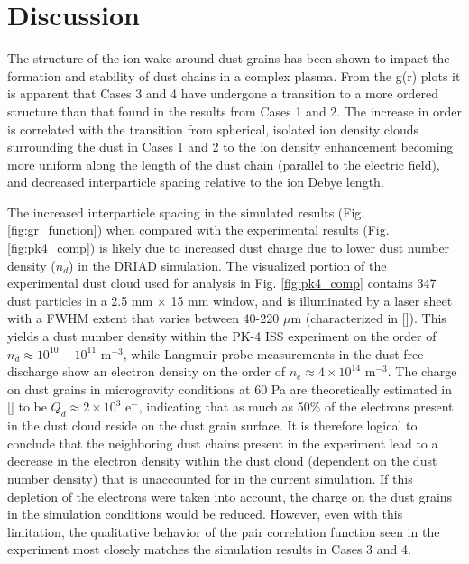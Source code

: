 \documentclass[aip,amsmath,amssymb,graphicx,floatfix,reprint]{revtex4-1}
\begin{document}
\section{Discussion}
\label{discussion}
The structure of the ion wake around dust grains has been shown to impact the formation and stability of dust chains in a complex plasma\cite{Ivlev2008,Matthews2020}.  From the g(r) plots it is apparent that Cases 3 and 4 have undergone a transition to a more ordered structure than that found in the results from Cases 1 and 2.  The increase in order is correlated with the transition from spherical, isolated ion density clouds surrounding the dust in Cases 1 and 2 to the ion density enhancement becoming more uniform along the length of the dust chain (parallel to the electric field), and decreased interparticle spacing relative to the ion Debye length.

The increased interparticle spacing in the simulated results (Fig. \ref{fig:gr_function}) when compared with the experimental results (Fig. \ref{fig:pk4_comp}) is likely due to increased dust charge due to lower dust number density ($n_d$) in the DRIAD simulation.  The visualized portion of the experimental dust cloud used for analysis in Fig. \ref{fig:pk4_comp} contains 347 dust particles in a 2.5 mm $\times$ 15 mm window, and is illuminated by a laser sheet with a FWHM extent that varies between 40-220 $\mu$m (characterized in []).  This yields a dust number density within the PK-4 ISS experiment on the order of $n_d \approx 10^{10}-10^{11}$ m$^{-3}$, while Langmuir probe measurements in the dust-free discharge\cite{Pustylnik2016} show an electron density on the order of $n_e\approx 4\times 10^{14}$ m$^{-3}$.  The charge on dust grains in microgravity conditions at 60 Pa are theoretically estimated in [] to be $Q_d\approx 2\times 10^3$ e$^-$, indicating that as much as 50$\%$ of the electrons present in the dust cloud reside on the dust grain surface.  It is therefore logical to conclude that the neighboring dust chains present in the experiment lead to a decrease in the electron density within the dust cloud (dependent on the dust number density) that is unaccounted for in the current simulation.  If this depletion of the electrons were taken into account, the charge on the dust grains in the simulation conditions would be reduced.  However, even with this limitation, the qualitative behavior of the pair correlation function seen in the experiment most closely matches the simulation results in Cases 3 and 4. 
\end{document}
